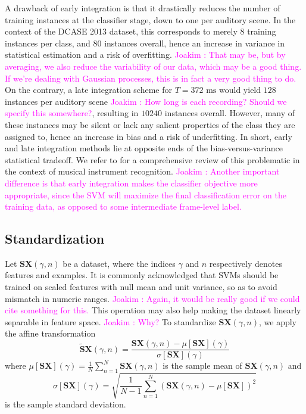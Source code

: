 \documentclass[journal]{IEEEtran}
\newcommand{\ja}[1]{\textcolor{magenta}{Joakim : #1}}
\begin{document}
A drawback of early integration is that it drastically reduces the number of training instances at the classifier stage, down to one per auditory scene.
In the context of the DCASE 2013 dataset, this corresponds to merely $8$ training instances per class, and $80$ instances overall, hence an increase in variance in statistical estimation and a risk of overfitting. \ja{That may be, but by averaging, we also reduce the variability of our data, which may be a good thing. If we're dealing with Gaussian processes, this is in fact a very good thing to do.}
On the contrary, a late integration scheme for $T=372\textrm{ ms}$ would yield $128$ instances per auditory scene \ja{How long is each recording? Should we specify this somewhere?}, resulting in $10240$ instances overall.
However, many of these instances may be silent or lack any salient properties of the class they are assigned to, hence an increase in bias and a risk of underfitting.
In short, early and late integration methods lie at opposite ends of the bias-versus-variance statistical tradeoff. We refer to \cite{Joder2009} for a comprehensive review of this problematic in the context of musical instrument recognition. \ja{Another important difference is that early integration makes the classifier objective more appropriate, since the SVM will maximize the final classification error on the training data, as opposed to some intermediate frame-level label.}

\subsection{Standardization}
\label{sec:stand}

Let $\mathbf{S}\boldsymbol{X}(\gamma,n)$ be a dataset, where the indices $\gamma$ and $n$ respectively denotes features and examples.
It is commonly acknowledged that SVMs should be trained on scaled features with null mean and unit variance, so as to avoid mismatch in numeric ranges. \ja{Again, it would be really good if we could cite something for this.}
This operation may also help making the dataset linearly separable in feature space. \ja{Why?}
To standardize $\mathbf{S}\boldsymbol{X}(\gamma,n)$, we apply the affine transformation
\begin{equation}
\widetilde{\mathbf{S}}\boldsymbol{X}(\gamma, n) =
\dfrac{ \mathbf{S}\boldsymbol{X}(\gamma, n) -
\mu[ \mathbf{S}\boldsymbol{X}](\gamma)}{\sigma[ \mathbf{S}\boldsymbol{X}](\gamma)}
\end{equation}
where $\mu[ \mathbf{S}\boldsymbol{X}](\gamma) = \frac{1}{N} \sum_{n=1}^{N} \mathbf{S}\boldsymbol{X}(\gamma,n)$ is the sample mean of $\mathbf{S}\boldsymbol{X}(\gamma,n)$ and
\begin{equation}
\sigma[\mathbf{S}\boldsymbol{X}] (\gamma) =
\sqrt{\frac{1}{N-1} \sum_{n=1}^{N}
\left( \mathbf{S}\boldsymbol{X}(\gamma,n) - \mu[\mathbf{S}\boldsymbol{X}] \right)^2}
\end{equation}
is the sample standard deviation.
\end{document}
